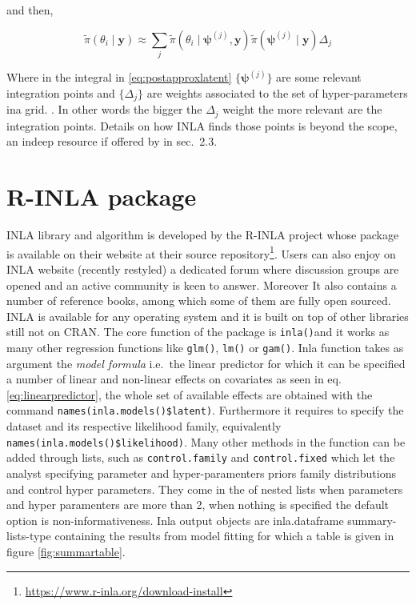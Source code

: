 \documentclass[
  12pt,
  a4paper,
  oneside]{book}
\newcommand{\passthrough}[1]{#1}
\DeclareRobustCommand{\href}[2]{#2\footnote{\url{#1}}}
\theoremstyle{definition}
\theoremstyle{definition}
\theoremstyle{definition}
\theoremstyle{remark}
\begin{document}
and then,

\begin{equation}
\tilde{\pi}\left(\theta_{i} \mid \boldsymbol{\mathbf{y}}\right) \approx \sum_{j} \tilde{\pi}\left(\theta_{i} \mid \boldsymbol{\psi}^{(j)}, \boldsymbol{\mathbf{y}}\right) \tilde{\pi}\left(\boldsymbol{\psi}^{(j)} \mid \boldsymbol{\mathbf{y}}\right) \Delta_{j}
\label{eq:postapproxlatent}
\end{equation}

Where in the integral in \eqref{eq:postapproxlatent} \(\{\boldsymbol{\psi}^{(j)}\}\) are some relevant integration points and \(\{\Delta_j\}\) are weights associated to the set of hyper-parameters ina grid. \citep{Blangiardo-Cameletti}.
In other words the bigger the \(\Delta_{j}\) weight the more relevant are the integration points. Details on how INLA finds those points is beyond the scope, an indeep resource if offered by \citet{wang2018bayesian} in sec.~2.3.

\hypertarget{rinla}{%
\section{R-INLA package}\label{rinla}}

INLA library and algorithm is developed by the R-INLA project whose package is available on their website at their \href{https://www.r-inla.org/download-install}{source repository}. Users can also enjoy on INLA website (recently restyled) a dedicated forum where discussion groups are opened and an active community is keen to answer. Moreover It also contains a number of reference books, among which some of them are fully open sourced. INLA is available for any operating system and it is built on top of other libraries still not on CRAN.
The core function of the package is \passthrough{\lstinline!inla()!}and it works as many other regression functions like \passthrough{\lstinline!glm()!}, \passthrough{\lstinline!lm()!} or \passthrough{\lstinline!gam()!}. Inla function takes as argument the \emph{model formula} i.e.~the linear predictor for which it can be specified a number of linear and non-linear effects on covariates as seen in eq. \eqref{eq:linearpredictor}, the whole set of available effects are obtained with the command \passthrough{\lstinline!names(inla.models()$latent)!}. Furthermore it requires to specify the dataset and its respective likelihood family, equivalently \passthrough{\lstinline!names(inla.models()$likelihood)!}.
Many other methods in the function can be added through lists, such as \passthrough{\lstinline!control.family!} and \passthrough{\lstinline!control.fixed!} which let the analyst specifying parameter and hyper-paramenters priors family distributions and control hyper parameters. They come in the of nested lists when parameters and hyper paramenters are more than 2, when nothing is specified the default option is non-informativeness.
Inla output objects are inla.dataframe summary-lists-type containing the results from model fitting for which a table is given in figure \ref{fig:summartable}.
\end{document}
